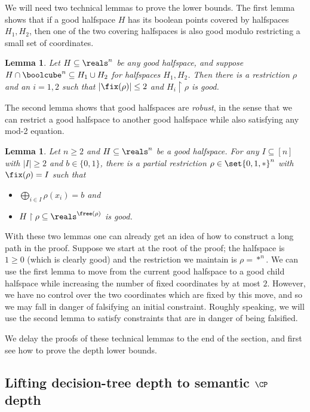\documentclass[11pt]{article}
\newtheorem{lemma}[theorem]{Lemma}
\begin{document}
We will need two technical lemmas to prove the lower bounds.
The first lemma shows that if a good halfspace $H$ has its boolean points covered by halfspaces $H_1, H_2$, then one of the two covering halfspaces is also good modulo restricting a small set of coordinates.
\begin{lemma}\label{lem:crux}
	Let $H \subseteq \reals^n$ be any good halfspace, and suppose $H \cap \boolcube^n \subseteq H_1 \cup H_2$ for halfspaces $H_1, H_2$.
	Then there is a restriction $\rho$ and an $i = 1,2$ such that $|\fix(\rho)| \leq 2$ and $H_i \restriction \rho$ is good.
\end{lemma}

The second lemma shows that good halfspaces are \emph{robust}, in the sense that we can restrict a good halfspace to another good halfspace while also satisfying any mod-2 equation.
\begin{lemma}\label{lem:consistent-restriction}
	Let $n \geq 2$ and $H \subseteq \reals^n$ be a good halfspace.
	For any $I \subseteq [n]$ with $|I| \geq 2$ and $b \in \{0,1\}$, there is a partial restriction $\rho \in \set{0,1,*}^n$ with $\fix(\rho) = I$ such that 
\begin{itemize}
	\item $\displaystyle{\bigoplus_{i \in I} \rho(x_i) = b}$ and
	\item $H \restriction \rho \subseteq \reals^{\free(\rho)}$ is good.
\end{itemize}
\end{lemma}

With these two lemmas one can already get an idea of how to construct a long path in the proof.
Suppose we start at the root of the proof; the halfspace is $1 \geq 0$ (which is clearly good) and the restriction we maintain is $\rho = *^n$.
We can use the first lemma to move from the current good halfspace to a good child halfspace while increasing the number of fixed coordinates by at most $2$.
However, we have no control over the two coordinates which are fixed by this move, and so we may fall in danger of falsifying an initial constraint.
Roughly speaking, we will use the second lemma to satisfy constraints that are in danger of being falsified.

We delay the proofs of these technical lemmas to the end of the section, and first see how to prove the depth lower bounds.


%
\subsection{Lifting decision-tree depth to semantic    %
  \texorpdfstring{$\CP$}{CP} depth} 
\end{document}
